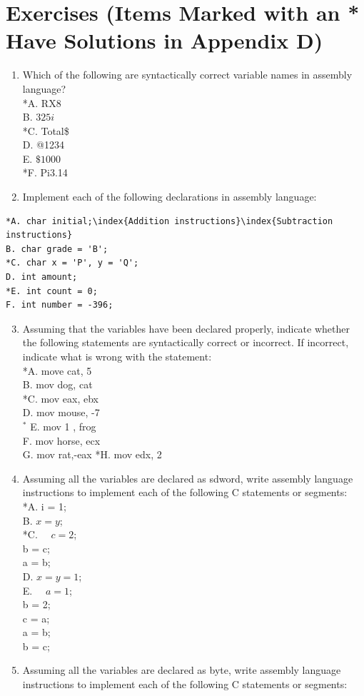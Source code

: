 \documentclass[10pt]{book}
\begin{document}
\section{Exercises (Items Marked with an * Have Solutions in Appendix D)}
\begin{enumerate}
  \item Which of the following are syntactically correct variable names in assembly language?\\
*A. RX8\\
B. $325 i$\\
*C. Total\$\\
D. @1234\\
E. $\$ 1000$\\
*F. Pi3.14
  \item Implement each of the following declarations in assembly language:
\end{enumerate}

\begin{verbatim}
*A. char initial;\index{Addition instructions}\index{Subtraction instructions}
B. char grade = 'B';
*C. char x = 'P', y = 'Q';
D. int amount;
*E. int count = 0;
F. int number = -396;
\end{verbatim}

\begin{enumerate}
  \setcounter{enumi}{2}
  \item Assuming that the variables have been declared properly, indicate whether the following statements are syntactically correct or incorrect. If incorrect, indicate what is wrong with the statement:\\
*A. move cat, 5\\
B. mov dog, cat\\

*C. mov eax, ebx\\
D. mov mouse, -7\\
${ }^{*}$ E. mov 1 , frog\\
F. mov horse, ecx\\
G. mov rat,-eax *H. mov edx, 2
  \item Assuming all the variables are declared as sdword, write assembly language instructions to implement each of the following C statements or segments:\\
*A. i = 1;\\
B. $x=y$;\\
*C. $\quad c=2$;\\
b = c;\\
a = b;\\
D. $x=y=1$;\\
E. $\quad a=1$;\\
b = 2;\\
c = a;\\
a = b;\\
b = c;
  \item Assuming all the variables are declared as byte, write assembly language instructions to implement each of the following C statements or segments:
\end{enumerate}
\end{document}
